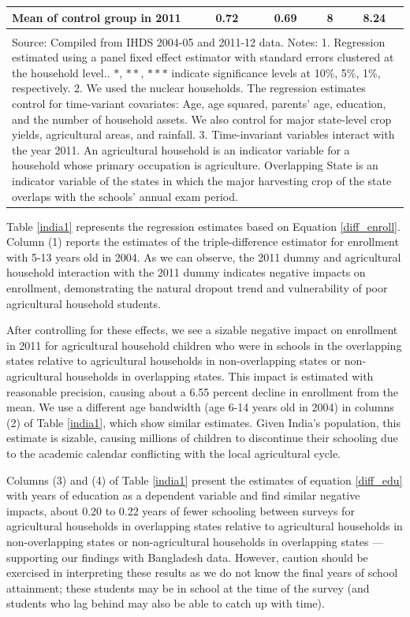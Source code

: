 \documentclass[12pt,letterpaper]{article}
\newcommand{\0}{\ensuremath{\mbox{\boldmath $0$}}}
\begin{document}
\begin{table}[h!]
\begin{center}
{{\begin{tabular}{lcccc}
Mean of control group in 2011          &       0.72 &       0.69 &          8 &       8.24 \\
\hline\\
\multicolumn{5}{p{20cm}}{{\footnotesize Source: Compiled from IHDS 2004-05 and 2011-12 data.
Notes: 1. Regression estimated using a panel fixed effect estimator with standard errors clustered at the household level.. $*$, $**$, $***$ indicate significance levels at 10\%, 5\%, 1\%, respectively.
2. We used the nuclear households. The regression estimates control for time-variant covariates: Age, age squared, parents' age, education, and the number of household assets. We also control for major state-level crop yields, agricultural areas, and rainfall. 
3. Time-invariant variables interact with the year 2011. An agricultural household is an indicator variable for a household whose primary occupation is agriculture. Overlapping State is an indicator variable of the states in which the major harvesting crop of the state overlaps with the schools' annual exam period. }}
\end{tabular}}}
\end{center}
\end{table}

Table \ref{india1} represents the regression estimates based on Equation \ref{diff_enroll}. Column (1) reports the estimates of the triple-difference estimator for enrollment with 5-13 years old in 2004. As we can observe, the 2011 dummy and agricultural household interaction with the 2011 dummy indicates negative impacts on enrollment, demonstrating the natural dropout trend and vulnerability of poor agricultural household students.

After controlling for these effects, we see a sizable negative impact on enrollment in 2011 for agricultural household children who were in schools in the overlapping states relative to agricultural households in non-overlapping states or non-agricultural households in overlapping states. This impact is estimated with reasonable precision, causing about a 6.55 percent decline in enrollment from the mean. We use a different age bandwidth (age 6-14 years old in 2004) in columns (2) of Table \ref{india1}, which show similar estimates. Given India's population, this estimate is sizable, causing millions of children to discontinue their schooling due to the academic calendar conflicting with the local agricultural cycle.  

Columns (3) and (4) of Table \ref{india1} present the estimates of equation \ref{diff_edu} with years of education as a dependent variable and find similar negative impacts, about 0.20 to 0.22 years of fewer schooling between surveys for agricultural households in overlapping states relative to agricultural households in non-overlapping states or non-agricultural households in overlapping states --- supporting our findings with Bangladesh data. However, caution should be exercised in interpreting these results as we do not know the final years of school attainment; these students may be in school at the time of the survey (and students who lag behind may also be able to catch up with time).
\end{document}
